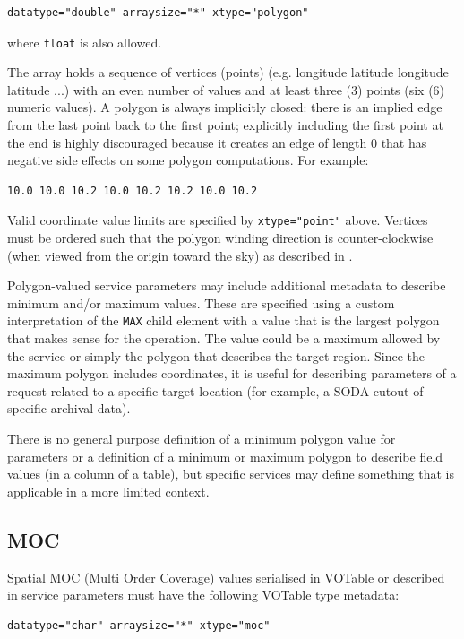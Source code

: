 \documentclass[11pt,letter]{ivoa}
\begin{document}
\begin{verbatim}
datatype="double" arraysize="*" xtype="polygon"
\end{verbatim}
\noindent where \verb|float| is also allowed.

The array holds a sequence of vertices (points) (e.g. longitude latitude longitude
latitude ...) with an even number of values and at least three (3) points (six
(6) numeric values). A polygon is always implicitly closed: there is an implied edge from
the last point back to the first point; explicitly including the first point at the end is
highly discouraged because it creates an edge of length 0 that has
negative side effects on some polygon computations. For example:

\begin{verbatim}
10.0 10.0 10.2 10.0 10.2 10.2 10.0 10.2
\end{verbatim}

Valid coordinate value limits are specified by \verb|xtype="point"| above.
Vertices must be ordered such that the polygon
winding direction is counter-clockwise (when viewed from the origin toward the
sky) as described in \citep{2007ivoa.spec.1030R}.

Polygon-valued service parameters may include additional metadata to describe minimum
and/or maximum values. These are specified using a custom interpretation of the
\verb|MAX| child element with a value that is the largest polygon that makes sense
for the operation. The value could be a maximum allowed by the service or simply
the polygon that describes the target region. Since the maximum polygon includes
coordinates, it is useful for describing parameters of a request related
to a specific target location (for example, a SODA cutout of specific archival data).

There is no general purpose definition of a minimum polygon value for parameters or
a definition of a minimum or maximum polygon to describe field values (in a column
of a table), but specific services may define something that is applicable in a
more limited context.

\subsection{MOC}
Spatial MOC (Multi Order Coverage) values serialised in VOTable or described in service parameters must
have the following VOTable type metadata:

\begin{verbatim}
datatype="char" arraysize="*" xtype="moc"
\end{verbatim}
\end{document}
